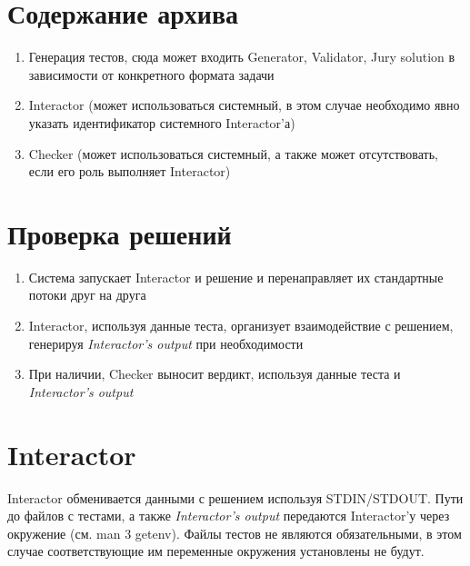 



\section{Содержание архива}
\begin{enumerate}
    \item Генерация тестов, сюда может входить Generator, Validator, Jury solution
        в зависимости от конкретного формата задачи
    \item Interactor (может использоваться системный,
        в этом случае необходимо явно указать идентификатор системного Interactor'а)
    \item Checker (может использоваться системный, а также может отсутствовать, если его роль выполняет Interactor)
\end{enumerate}

\pagebreak

\section{Проверка решений}
\begin{enumerate}
    \item Система запускает Interactor и решение и перенаправляет их стандартные потоки друг на друга
    \item Interactor, используя данные теста, организует взаимодействие с решением, генерируя \textit{Interactor's output} при необходимости
    \item При наличии, Checker выносит вердикт, используя данные теста и \textit{Interactor's output}
\end{enumerate}


\vspace{2cm}


\pagebreak

\section{Interactor}
Interactor обменивается данными с решением используя STDIN/STDOUT.
Пути до файлов с тестами, а также \textit{Interactor's output} передаются
Interactor'у через окружение (см. man 3 getenv).
Файлы тестов не являются обязательными, в этом случае
соответствующие им переменные окружения установлены не будут.

